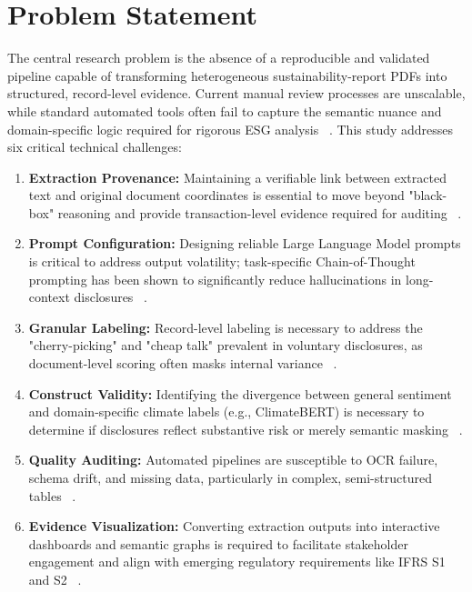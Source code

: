 \section{Problem Statement}

The central research problem is the absence of a reproducible and validated pipeline capable of transforming heterogeneous sustainability-report PDFs into structured, record-level evidence. Current manual review processes are unscalable, while standard automated tools often fail to capture the semantic nuance and domain-specific logic required for rigorous ESG analysis  ~\cite{p__raghavendra_rau_a32af285}. This study addresses six critical technical challenges:
\begin{enumerate}
\item 

\textbf{Extraction Provenance:} Maintaining a verifiable link between extracted text and original document coordinates is essential to move beyond "black-box" reasoning and provide transaction-level evidence required for auditing  ~\cite{steven_paul_nohr_a6874924}.\item 

\textbf{Prompt Configuration:} Designing reliable Large Language Model prompts is critical to address output volatility; task-specific Chain-of-Thought prompting has been shown to significantly reduce hallucinations in long-context disclosures  ~\cite[]{siqi_sun_c8f93141, association_for_artificial_intelligence_2026_86e12eae}.\item 

\textbf{Granular Labeling:} Record-level labeling is necessary to address the "cherry-picking" and "cheap talk" prevalent in voluntary disclosures, as document-level scoring often masks internal variance  ~\cite[]{julia_bingler_268445e3, habiba_al_shaer_c2f5394b}.\item 

\textbf{Construct Validity:} Identifying the divergence between general sentiment and domain-specific climate labels (e.g., ClimateBERT) is necessary to determine if disclosures reflect substantive risk or merely semantic masking  ~\cite[]{julia_bingler_268445e3, julia_bingler_6b484913}.\item 

\textbf{Quality Auditing:} Automated pipelines are susceptible to OCR failure, schema drift, and missing data, particularly in complex, semi-structured tables  ~\cite[]{siqi_sun_c8f93141, jacob_beck_9548a833}.\item 

\textbf{Evidence Visualization:} Converting extraction outputs into interactive dashboards and semantic graphs is required to facilitate stakeholder engagement and align with emerging regulatory requirements like IFRS S1 and S2  ~\cite{ahmad_zaki_49372c30}.
\end{enumerate}

